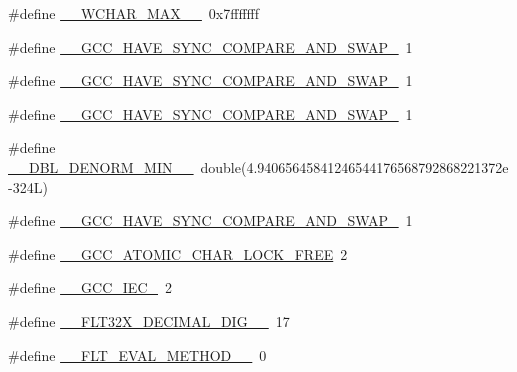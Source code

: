 \begin{DoxyCompactItemize}
\item 
\#define \hyperlink{cmake-build-debug_2babel__client__autogen_2moc__predefs_8h_a65ac8cd0434319a3a31dc031409c218a}{\+\_\+\+\_\+\+W\+C\+H\+A\+R\+\_\+\+M\+A\+X\+\_\+\+\_\+}~0x7fffffff
\item 
\#define \hyperlink{cmake-build-debug_2babel__client__autogen_2moc__predefs_8h_a33433eca9e18e14156165252746f4d44}{\+\_\+\+\_\+\+G\+C\+C\+\_\+\+H\+A\+V\+E\+\_\+\+S\+Y\+N\+C\+\_\+\+C\+O\+M\+P\+A\+R\+E\+\_\+\+A\+N\+D\+\_\+\+S\+W\+A\+P\+\_}~1
\item 
\#define \hyperlink{cmake-build-debug_2babel__client__autogen_2moc__predefs_8h_a7237ce09defceeebe3ba0afc528275ac}{\+\_\+\+\_\+\+G\+C\+C\+\_\+\+H\+A\+V\+E\+\_\+\+S\+Y\+N\+C\+\_\+\+C\+O\+M\+P\+A\+R\+E\+\_\+\+A\+N\+D\+\_\+\+S\+W\+A\+P\+\_}~1
\item 
\#define \hyperlink{cmake-build-debug_2babel__client__autogen_2moc__predefs_8h_a6310789290c9c5717826b56443ce69ec}{\+\_\+\+\_\+\+G\+C\+C\+\_\+\+H\+A\+V\+E\+\_\+\+S\+Y\+N\+C\+\_\+\+C\+O\+M\+P\+A\+R\+E\+\_\+\+A\+N\+D\+\_\+\+S\+W\+A\+P\+\_}~1
\item 
\#define \hyperlink{cmake-build-debug_2babel__client__autogen_2moc__predefs_8h_aca2a716d3e84ccffe000390bb2e2fb38}{\+\_\+\+\_\+\+D\+B\+L\+\_\+\+D\+E\+N\+O\+R\+M\+\_\+\+M\+I\+N\+\_\+\+\_\+}~double(4.\+94065645841246544176568792868221372e-\/324\+L)
\item 
\#define \hyperlink{cmake-build-debug_2babel__client__autogen_2moc__predefs_8h_a86bb5059d696b19082c1aff4ae93a87a}{\+\_\+\+\_\+\+G\+C\+C\+\_\+\+H\+A\+V\+E\+\_\+\+S\+Y\+N\+C\+\_\+\+C\+O\+M\+P\+A\+R\+E\+\_\+\+A\+N\+D\+\_\+\+S\+W\+A\+P\+\_}~1
\item 
\#define \hyperlink{cmake-build-debug_2babel__client__autogen_2moc__predefs_8h_a403ff8d656461ff5a083fb47f73c7da3}{\+\_\+\+\_\+\+G\+C\+C\+\_\+\+A\+T\+O\+M\+I\+C\+\_\+\+C\+H\+A\+R\+\_\+\+L\+O\+C\+K\+\_\+\+F\+R\+EE}~2
\item 
\#define \hyperlink{cmake-build-debug_2babel__client__autogen_2moc__predefs_8h_a0a3bd26d0b040f0781a238e4aedd3dbe}{\+\_\+\+\_\+\+G\+C\+C\+\_\+\+I\+E\+C\+\_}~2
\item 
\#define \hyperlink{cmake-build-debug_2babel__client__autogen_2moc__predefs_8h_a00a9f6ceb42fbe18b789b4c1949c49f2}{\+\_\+\+\_\+\+F\+L\+T32\+X\+\_\+\+D\+E\+C\+I\+M\+A\+L\+\_\+\+D\+I\+G\+\_\+\+\_\+}~17
\item 
\#define \hyperlink{cmake-build-debug_2babel__client__autogen_2moc__predefs_8h_a737828904768e0ab49acbdb3371d8445}{\+\_\+\+\_\+\+F\+L\+T\+\_\+\+E\+V\+A\+L\+\_\+\+M\+E\+T\+H\+O\+D\+\_\+\+\_\+}~0

\end{DoxyCompactItemize}
